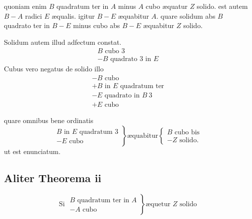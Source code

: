 \documentclass[11pt,a4paper]{article}
\begin{document}
quoniam enim $B$ quadratum ter in $A$ minus $A$ cubo æquatur $Z$ solido. est autem $B - A$ radici $E$ æqualis. igitur $B - E$ æquabitur $A$. quare solidum abs $B$ quadrato ter in $B - E$ minus cubo abs $B - E$ æquabitur $Z$ solido.

Solidum autem illud adfectum constat.
\[ \begin{array}{l} B \text{ cubo } 3 \\ - B \text{ quadrato } 3 \text{ in } E \end{array} \]
Cubus vero negatus de solido illo
\[ \begin{array}{l} - B \text{ cubo} \\ + B \text{ in } E \text{ quadratum ter} \\ - E \text{ quadrato in } B\ 3 \\ + E \text{ cubo} \end{array} \]


quare omnibus bene ordinatis
\[ \left.\begin{array}{l} B \text{ in } E \text{ quadratum } 3 \\ - E \text{ cubo} \end{array}\right\} \text{æquabitur} \left\{\begin{array}{l} B \text{ cubo bis} \\ - Z \text{ solido.} \end{array}\right. \]
ut est enunciatum.

\subsection*{Aliter Theorema ii}

\[ \text{Si } \left.\begin{array}{l} B \text{ quadratum ter in } A \\ - A \text{ cubo} \end{array}\right\} \text{æquetur } Z \text{ solido} \]
\end{document}
